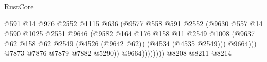 \begin{lexlean}{RustCore}
\begin{coremodule}
                                                        @591
                                                        @14
                                                        @976
                                                        @2552
                                                        @1115
                                                        @636
                                                        (@9577
                                                          @558
                                                          @591
                                                          @2552
                                                          (@9630
                                                            @557
                                                            @14
                                                            @590
                                                            @1025
                                                            @2551
                                                            @9646
                                                            (@9582
                                                              @164
                                                              @176
                                                              @158
                                                              @11
                                                              @2549
                                                              @1008
                                                              (@9637
                                                                @62
                                                                @158
                                                                @62
                                                                @2549
                                                                (@4526 (@9642 @62))
                                                                (@4534 (@4535 @2549)))
                                                              @9664)))
                                                        @7873
                                                        @7876
                                                        @7879
                                                        @7882
                                                        @5290))
                                                    @9664))))))))
                                    @8208
                                    @8211
                                    @8214

\end{coremodule}
\end{lexlean}
